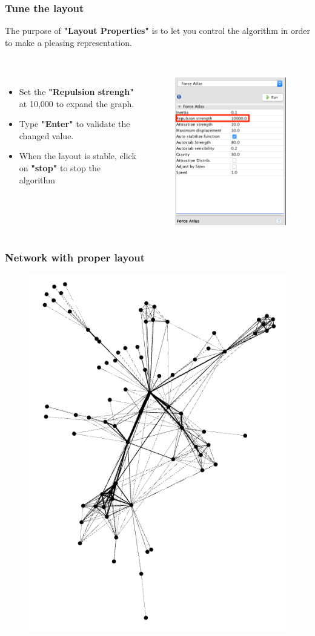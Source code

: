 \documentclass[10pt]{beamer}
\begin{document}
\begin{frame}
\frametitle{Tune the layout}
The purpose of \textbf{"Layout Properties"} is to let you control the algorithm in order to make a pleasing representation. \\~\\

\begin{columns}[c] 
\begin{itemize}
\item Set the \textbf{"Repulsion strengh"} at 10,000 to expand the graph.
\item Type \textbf{"Enter"} to validate the changed value.
\item When the layout is stable, click on \textbf{"stop"} to stop the algorithm
\end{itemize}

\begin{figure}
\includegraphics[width=0.5\linewidth]{figures/layout_controled.png}
\end{figure}
\end{columns}
\end{frame}

\begin{frame}
\frametitle{Network with proper layout}
\begin{figure}
\includegraphics[width=0.4\linewidth]{figures/network_with_layout_controlled.png}
\end{figure}
\end{frame}
\end{document}
